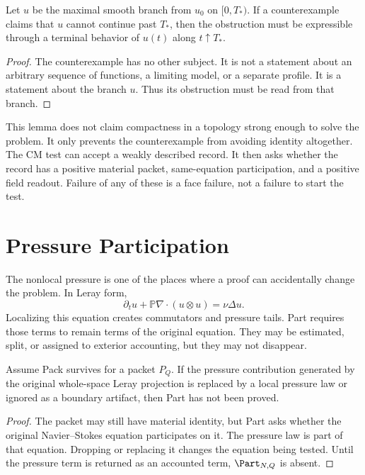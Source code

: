 \begin{lemma}
Let \(u\) be the maximal smooth branch from \(u_0\) on \([0,T_*)\).
If a counterexample claims that \(u\) cannot continue past \(T_*\), then the obstruction must be expressible through a terminal behavior of \(u(t)\) along \(t\uparrow T_*\).
\end{lemma}

\begin{proof}
The counterexample has no other subject.
It is not a statement about an arbitrary sequence of functions, a limiting model, or a separate profile.
It is a statement about the branch \(u\).
Thus its obstruction must be read from that branch.
\end{proof}

This lemma does not claim compactness in a topology strong enough to solve the problem.
It only prevents the counterexample from avoiding identity altogether.
The CM test can accept a weakly described record.
It then asks whether the record has a positive material packet, same-equation participation, and a positive field readout.
Failure of any of these is a face failure, not a failure to start the test.

\section{Pressure Participation}

The nonlocal pressure is one of the places where a proof can accidentally change the problem.
In Leray form,
\[
  \partial_t u+\mathbb P\nabla\cdot(u\otimes u)=\nu\Delta u.
\]
Localizing this equation creates commutators and pressure tails.
Part requires those terms to remain terms of the original equation.
They may be estimated, split, or assigned to exterior accounting, but they may not disappear.

\begin{proposition}
Assume Pack survives for a packet \(P_Q\).
If the pressure contribution generated by the original whole-space Leray projection is replaced by a local pressure law or ignored as a boundary artifact, then Part has not been proved.
\end{proposition}

\begin{proof}
The packet may still have material identity, but Part asks whether the original Navier--Stokes equation participates on it.
The pressure law is part of that equation.
Dropping or replacing it changes the equation being tested.
Until the pressure term is returned as an accounted term, \(\Part_{N,Q}\) is absent.
\end{proof}

